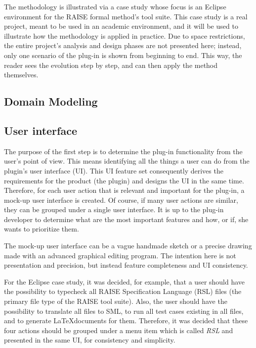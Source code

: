 \documentclass[conference]{IEEEtran}
\newcommand{\note}[1]{\todo[inline,color=red!40]{#1}}
\begin{document}
The methodology is illustrated via a case study whose focus is an
Eclipse environment for the RAISE formal method's tool suite.  This
case study is a real project, meant to be used in an academic
environment, and it will be used to illustrate how the methodology is
applied in practice. Due to space restrictions, the entire project's
analysis and design phases are not presented here; instead, only one
scenario of the plug-in is shown from beginning to end.  This way, the
reader sees the evolution step by step, and can then apply the method
themselves.

\subsection{Domain Modeling}
\label{sec:domain-modeling}

\note{To be written.}

\subsection{User interface}
\label{sec:user-interface}

The purpose of the first step is to determine the plug-in
functionality from the user's point of view.  This means identifying
all the things a user can do from the plugin's user interface (UI).
This UI feature set consequently derives the requirements for the
product (the plugin) and designs the UI in the same time.  Therefore,
for each user action that is relevant and important for the plug-in, a
mock-up user interface is created.  Of course, if many user actions
are similar, they can be grouped under a single user interface.  It is
up to the plug-in developer to determine what are the most important
features and how, or if, she wants to prioritize them.

The mock-up user interface can be a vague handmade sketch or a
precise drawing made with an advanced graphical editing program.  The
intention here is not presentation and precision, but instead feature
completeness and UI consistency.

For the Eclipse case study, it was decided, for example, that a user
should have the possibility to typecheck all RAISE Specification
Language (RSL) files (the primary file type of the RAISE tool suite).
Also, the user should have the possibility to translate all files to
SML, to run all test cases existing in all files, and to generate
\LaTeX documents for them.  Therefore, it was decided that these four
actions should be grouped under a menu item which is called \emph{RSL}
and presented in the same UI, for consistency and simplicity.  
\end{document}
